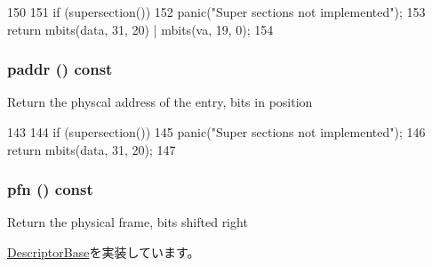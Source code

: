 \begin{DoxyCode}
150         {
151             if (supersection())
152                 panic("Super sections not implemented\n");
153             return mbits(data, 31, 20) | mbits(va, 19, 0);
154         }
\end{DoxyCode}
\hypertarget{classArmISA_1_1TableWalker_1_1L1Descriptor_a26f24be1556c1c0ac2c42e1eff5e1197}{
\subsubsection[{paddr}]{ paddr () const}}
\label{classArmISA_1_1TableWalker_1_1L1Descriptor_a26f24be1556c1c0ac2c42e1eff5e1197}
Return the physcal address of the entry, bits in position 


\begin{DoxyCode}
143         {
144             if (supersection())
145                 panic("Super sections not implemented\n");
146             return mbits(data, 31, 20);
147         }
\end{DoxyCode}
\hypertarget{classArmISA_1_1TableWalker_1_1L1Descriptor_ae6bfcb957f6df6777f3294e78ac298af}{
\subsubsection[{pfn}]{ pfn () const}}
\label{classArmISA_1_1TableWalker_1_1L1Descriptor_ae6bfcb957f6df6777f3294e78ac298af}
Return the physical frame, bits shifted right 

\hyperlink{classArmISA_1_1TableWalker_1_1DescriptorBase_a5e759a05b3056231f9f65a12f46c6a12}{DescriptorBase}を実装しています。


